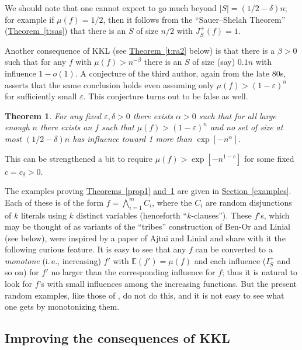 \documentclass[11pt]{article}
\numberwithin{equation}{section}
\theoremstyle{definition}
\theoremstyle{plain}
\newcommand{\ie}{i.\,e.}
\newcommand{\expref}[2]{\hyperref[#2]{#1~\ref{#2}}}
\newtheorem{thm}{Theorem}[section]
\newcommand{\mn}[0]{\medskip\noindent}
\newcommand{\nin}[0]{\noindent}
\newcommand{\0}[0]{\emptyset}
\newcommand{\ga}[0]{\alpha }
\newcommand{\gb}[0]{\beta }
\newcommand{\gd}[0]{\delta }
\newcommand{\eps}[0]{\varepsilon }
\begin{document}
\nin
We should note that one cannot expect to go much
beyond $|S|=(1/2-\gd)n$; for example if $\mu(f)  =1/2$,
then it follows from the ``Sauer--Shelah Theorem''
(\expref{Theorem}{t:sas}) that there is
an $S$ of size $n/2$ with
$J_S^+(f) = 1$.

Another consequence of KKL (see \expref{Theorem}{t:ra2} below)
is that there is a $\gb>0$ such that for any $f$ with $\mu(f) > n^{-\beta}$
there is an $S$ of size (say) $0.1 n$ with influence $1-o(1)$.
A conjecture of the third author, again from
the late 80s, asserts
that the same conclusion holds even assuming only
$\mu(f) > (1-\eps)^n$
for sufficiently small $\eps$.
This conjecture turns out to be false as well.  %


%
\begin{thm}\label{prop2}
For any fixed $\eps, \gd>0$
%
there exists $\ga > 0$ such that for all large enough $n$
%
there exists an $f$ %
%
such that
$\mu(f) > (1-\eps)^n$ and no set of %
%
size at most $(1/2-\gd)n$   %
%
has influence
%
toward   %
1 more than $\exp[-n^\ga]$.
\end{thm}


\mn
This can be strengthened a bit to require
$\mu(f)  > \exp[-n^{1-c}]$ for some fixed $c=c_\gd>0$.





The examples proving \expref{Theorems}{prop1} \expref{and}{prop2} 
are given in \expref{Section}{examples}.
Each of these is of the form %
$f= \bigwedge_{i=1}^m C_i$,  %
where the %
$C_i$  %
are random %
disjunctions %
of $k$ literals
using $k$ distinct variables (henceforth ``$k$-clauses'').
These $f$'s, %
%
which may be thought of as
variants of the ``tribes''
construction of Ben-Or and Linial
(see below),
were inspired by a paper of
Ajtai and Linial \cite {AL} and share with it the following
curious feature.
%
It is  %
easy to see that any $f$ can be converted to a
\emph{monotone}
(\ie, increasing) $f'$ with $\mathbb E (f')=\mu(f) $ and each
influence ($I_S^+$ and so on) for $f'$ no larger than
the corresponding influence for $f$;
thus %
it is  %
natural to look for $f$'s %
%
with small influences
among the increasing functions.
But the present random examples, like those of \cite{AL},
do not do this, and %
it is %
not easy to see what one gets by monotonizing them.

\subsection *{Improving the consequences of KKL}
\end{document}

